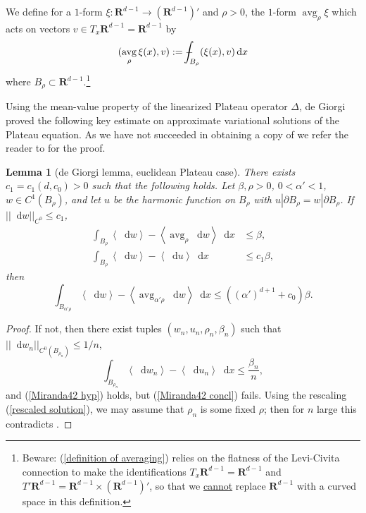 \documentclass[reqno,10pt]{amsart}
\newcommand{\RR}{\mathbf{R}}
\DeclareMathOperator{\avg}{avg}
\newcommand*\dif{\mathop{}\!\mathrm{d}}
\def\Japan#1{\left \langle #1 \right \rangle}
\newtheorem{lemma}[theorem]{Lemma}
\theoremstyle{definition}
\numberwithin{equation}{section}
\def\Xint#1{\mathchoice
{\XXint\displaystyle\textstyle{#1}}%
{\XXint\textstyle\scriptstyle{#1}}%
{\XXint\scriptstyle\scriptscriptstyle{#1}}%
{\XXint\scriptscriptstyle\scriptscriptstyle{#1}}%
\!\int}
\def\XXint#1#2#3{{\setbox0=\hbox{$#1{#2#3}{\int}$ }
\vcenter{\hbox{$#2#3$ }}\kern-.6\wd0}}
\def\dashint{\Xint-}
\begin{document}
We define for a $1$-form $\xi: \RR^{d - 1} \to (\RR^{d - 1})'$ and $\rho > 0$, the $1$-form $\avg_\rho \xi$ which acts on vectors $v \in T_x\RR^{d - 1} = \RR^{d - 1}$ by
\begin{equation}\label{definition of averaging}
(\avg_\rho \xi(x), v) := \dashint_{B_\rho} (\xi(x), v) \dif x
\end{equation}
where $B_\rho \subset \RR^{d - 1}$.\footnote{Beware: (\ref{definition of averaging}) relies on the flatness of the Levi-Civita connection to make the identifications $T_x\RR^{d - 1} = \RR^{d - 1}$ and $T'\RR^{d - 1} = \RR^{d - 1} \times (\RR^{d - 1})'$, so that we \underline{cannot} replace $\RR^{d - 1}$ with a curved space in this definition.}

Using the mean-value property of the linearized Plateau operator $\Delta$, de Giorgi \cite{deGiorgi61} proved the following key estimate on approximate variational solutions of the Plateau equation. As we have not succeeded in obtaining a copy of \cite{deGiorgi61} we refer the reader to \cite{Miranda66} for the proof.

\begin{lemma}[de Giorgi lemma, euclidean Plateau case]\label{Miranda42 quant}
There exists $c_1 = c_1(d, c_0) > 0$ such that the following holds.
Let $\beta, \rho > 0$, $0 < \alpha' < 1$, $w \in C^1(B_\rho)$, and let $u$ be the harmonic function on $B_\rho$ with $u|\partial B_\rho = w|\partial B_\rho$.
If $||\dif w||_{C^0} \leq c_1$,
\begin{align}
\int_{B_\rho} \Japan{\dif w} - \Japan{\avg_\rho \dif w} \dif x &\leq \beta, \label{Miranda42 hyp} \\
\int_{B_\rho} \Japan{\dif w} - \Japan{\dif u} \dif x &\leq c_1 \beta,
\end{align}
then 
\begin{equation}\label{Miranda42 concl}
\int_{B_{\alpha' \rho}} \Japan{\dif w} - \Japan{\avg_{\alpha' \rho} \dif w} \dif x \leq ((\alpha')^{d + 1} + c_0) \beta.
\end{equation}
\end{lemma}
\begin{proof}
If not, then there exist tuples $(w_n, u_n, \rho_n, \beta_n)$ such that $||\dif w_n||_{C^0(B_{\rho_n})} \leq 1/n$,
$$\int_{B_{\rho_n}} \Japan{\dif w_n} - \Japan{\dif u_n} \dif x \leq \frac{\beta_n}{n},$$
and (\ref{Miranda42 hyp}) holds, but (\ref{Miranda42 concl}) fails. 
Using the rescaling (\ref{rescaled solution}), we may assume that $\rho_n$ is some fixed $\rho$; then for $n$ large this contradicts \cite[Lemma 4.2]{Miranda66}. 
\end{proof}
\end{document}
